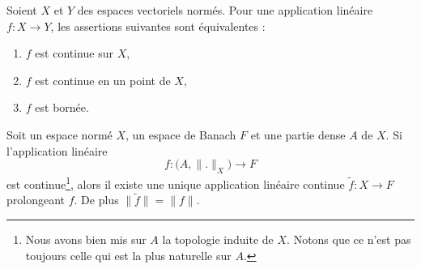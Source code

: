 \begin{theorem}      \label{ThoCaMpKO}
	Soient \( X\) et \( Y\) des espaces vectoriels normés. Pour une application linéaire \( f\colon X\to Y\), les assertions suivantes sont équivalentes :
	\begin{enumerate}
		\item
		      \( f\) est continue sur \( X\),
		\item
		      \( f\) est continue en un point de \( X\),
		\item
		      \( f\) est bornée.
	\end{enumerate}
\end{theorem}

\begin{proposition} \label{PropTTiRgAq}
	Soit un espace normé \( X\), un espace de Banach \( F\) et une partie dense \( A\) de \( X\). Si l'application linéaire
	\begin{equation}
		f\colon   \big( A,\| . \|_X \big)  \to F
	\end{equation}
	est continue\footnote{Nous avons bien mis sur \( A\) la topologie induite de \( X\). Notons que ce n'est pas toujours celle qui est la plus naturelle sur \( A\).}, alors il existe une unique application linéaire continue \( \tilde f\colon X\to F\) prolongeant \( f\). De plus \( \| \tilde f \|=\| f \|\).
\end{proposition}

